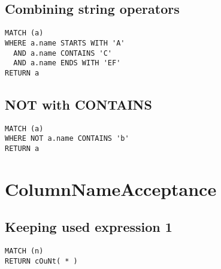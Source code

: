 \subsection{Combining string operators}

\begin{lstlisting}
MATCH (a)
WHERE a.name STARTS WITH 'A'
  AND a.name CONTAINS 'C'
  AND a.name ENDS WITH 'EF'
RETURN a
\end{lstlisting}

\subsection{NOT with CONTAINS}

\begin{lstlisting}
MATCH (a)
WHERE NOT a.name CONTAINS 'b'
RETURN a
\end{lstlisting}

\section{ColumnNameAcceptance}

\subsection{Keeping used expression 1}

\begin{lstlisting}
MATCH (n)
RETURN cOuNt( * )
\end{lstlisting}

